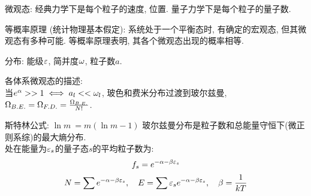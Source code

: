 \documentclass[UTF8,8pt]{ctexart}
\newcommand{\q}[1]{{\color{red} #1}}
\begin{document}
\begin{multicols}{3}
微观态: 经典力学下是每个粒子的速度, 位置. 量子力学下是每个粒子的量子数.

\q{等概率原理 (统计物理基本假定)}: 系统处于一个平衡态时, 有确定的宏观态, 但其微观态有多种可能. 等概率原理表明, 其各个微观态出现的概率相等.

分布: 能级$\varepsilon$, 简并度$\omega$, 粒子数$a$.

各体系微观态的描述: \\
当$e^\alpha>>1 \iff a_l<<\omega_l$, 玻色和费米分布过渡到玻尔兹曼, $\Omega_{B.E.}=\Omega_{F.D.}=\frac{\Omega_{B.E.}}{N!}$.

\q{斯特林公式}: $\ln m~ =m(\ln m-1)$
玻尔兹曼分布是粒子数和总能量守恒下(微正则系综)的最大熵分布.\\
处在能量为$\varepsilon_s$的量子态$s$的平均粒子数为:
$$f_s=e^{-\alpha-\beta\varepsilon_s}$$
$$N=\sum e^{-\alpha-\beta\varepsilon_s}, \quad E=\sum \varepsilon_s e^{-\alpha-\beta\varepsilon_s}, \quad \beta=\frac{1}{kT}$$


\end{multicols}
\end{document}
